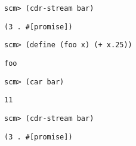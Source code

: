 \begin{lstlisting}
scm> (cdr-stream bar)
\end{lstlisting}
\begin{solution}[.25in]
\begin{lstlisting}
(3 . #[promise])
\end{lstlisting}
\end{solution}

\begin{lstlisting}
scm> (define (foo x) (+ x.25))
\end{lstlisting}
\begin{solution}[.25in]
\texttt{foo}
\end{solution}

\begin{lstlisting}
scm> (car bar)
\end{lstlisting}
\begin{solution}[.25in]
\texttt{11}
\end{solution}

\begin{lstlisting}
scm> (cdr-stream bar)
\end{lstlisting}
\begin{solution}[.25in]
\begin{lstlisting}
(3 . #[promise])
\end{lstlisting}
\end{solution}
